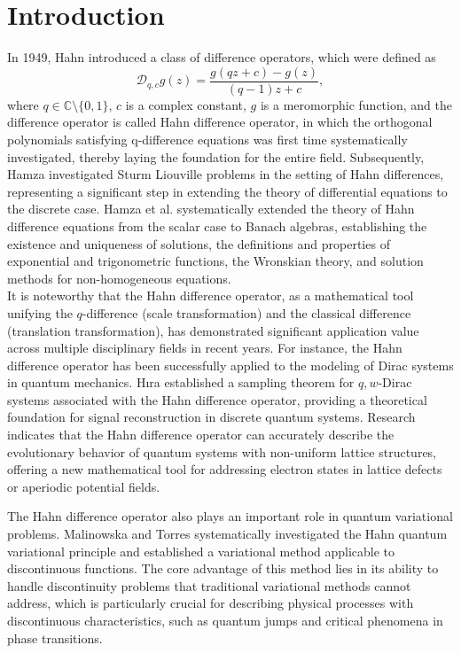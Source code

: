 \documentclass[sn-mathphys-num]{sn-jnl}%
\theoremstyle{thmstyleone}%
\theoremstyle{thmstyletwo}%
\theoremstyle{thmstylethree}%
\begin{document}
\section{Introduction}
\indent In 1949, Hahn \cite{Hahn} introduced a class of difference operators, which were defined as
\begin{equation*}
	\mathcal{D}_{q,c}g(z)=\frac{g(qz+c)-g(z)}{(q-1)z+c},
\end{equation*}
where $q\in\mathbb{C}\setminus\{0,1\}$, $c$ is a complex constant, \(g\) is a meromorphic function, and the difference operator is called Hahn difference operator, in which the orthogonal polynomials satisfying q-difference equations was first time systematically investigated, thereby laying the foundation for the entire field. Subsequently, Hamza \cite{Ham} investigated Sturm Liouville problems in the setting of Hahn differences, representing a significant step in extending the theory of differential equations to the discrete case. Hamza et al. \cite{Hamza} systematically extended the theory of Hahn difference equations from the scalar case to Banach algebras, establishing the existence and uniqueness of solutions, the definitions and properties of exponential and trigonometric functions, the Wronskian theory, and solution methods for non-homogeneous equations.\\
\indent It is noteworthy that the Hahn difference operator, as a mathematical tool unifying the \(q\)-difference (scale transformation) and the classical difference (translation transformation), has demonstrated significant application value across multiple disciplinary fields in recent years. For instance, the Hahn difference operator has been successfully applied to the modeling of Dirac systems in quantum mechanics. H\i ra \cite{H, Hira} established a sampling theorem for \(q,w\)-Dirac systems associated with the Hahn difference operator, providing a theoretical foundation for signal reconstruction in discrete quantum systems. Research indicates that the Hahn difference operator can accurately describe the evolutionary behavior of quantum systems with non-uniform lattice structures, offering a new mathematical tool for addressing electron states in lattice defects or aperiodic potential fields.

The Hahn difference operator also plays an important role in quantum variational problems. Malinowska and Torres \cite{Mal, M} systematically investigated the Hahn quantum variational principle and established a variational method applicable to discontinuous functions. The core advantage of this method lies in its ability to handle discontinuity problems that traditional variational methods cannot address, which is particularly crucial for describing physical processes with discontinuous characteristics, such as quantum jumps and critical phenomena in phase transitions.
\end{document}
